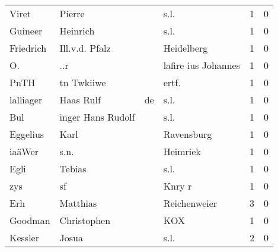 \begin{center}
\begin{tiny}
\begin{longtabu}{llllrr}
                    Viret &                             Pierre &             &                                        s.l. &          1 &         0 \\
                  Guineer &                           Heinrich &             &                                        s.l. &          1 &         0 \\
                Friedrich &                     Ill.v.d. Pfalz &             &                                  Heidelberg &          1 &         0 \\
                       O. &                                ..r &             &                         lafire ius Johannes &          1 &         0 \\
                     PnTH &                         tn Twkiiwe &             &                                      ertf.  &          1 &         0 \\
                lalliager &                          Haas Rulf &          de &                                        s.l. &          1 &         0 \\
                      Bul &                  inger Hans Rudolf &             &                                        s.l. &          1 &         0 \\
                 Eggelius &                               Karl &             &                                  Ravensburg &          1 &         0 \\
                   iaäWer &                               s.n. &             &                                    Heimriek &          1 &         0 \\
                     Egli &                             Tebias &             &                                        s.l. &          1 &         0 \\
                      zys &                                 sf &             &                                      Knry r &          1 &         0 \\
                      Erh &                           Matthias &             &                                Reichenweier &          3 &         0 \\
                  Goodman &                        Christophen &             &                                         KOX &          1 &         0 \\
                  Kessler &                              Josua &             &                                        s.l. &          2 &         0 \\

\end{longtabu}
\end{tiny}
\end{center}
